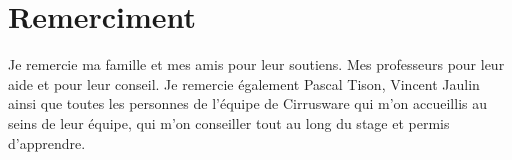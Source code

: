 \section{Remerciment}

Je remercie ma famille et mes amis pour leur soutiens. Mes professeurs pour leur aide et pour leur conseil.
Je remercie également Pascal Tison, Vincent Jaulin ainsi que toutes les personnes de l'équipe de Cirrusware qui m'on accueillis au seins de leur équipe, qui m'on conseiller tout au long du stage et permis d'apprendre.
